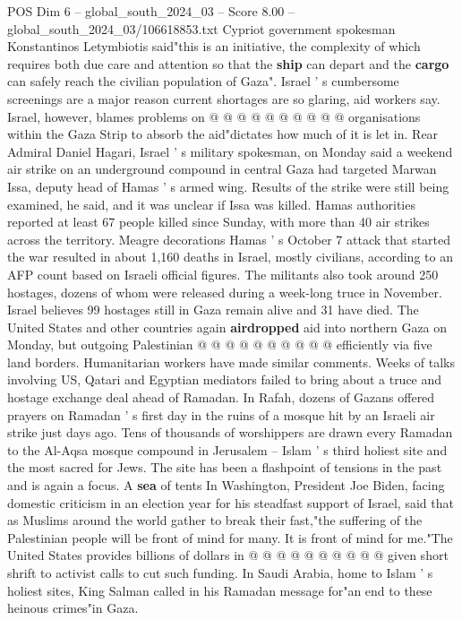 \begin{textsample}{POS Dim 6 – global\_south\_2024\_03 – Score 8.00 – global\_south\_2024\_03/106618853.txt}
Cypriot government spokesman Konstantinos Letymbiotis said"this is an initiative, the complexity of which requires both due care and attention so that the \textbf{ship} can depart and the \textbf{cargo} can safely reach the civilian population of Gaza".
Israel ' s cumbersome screenings are a major reason current shortages are so glaring, aid workers say.
Israel, however, blames problems on @ @ @ @ @ @ @ @ @ @ organisations within the Gaza Strip to absorb the aid"dictates how much of it is let in.
Rear Admiral Daniel Hagari, Israel ' s military spokesman, on Monday said a weekend air strike on an underground compound in central Gaza had targeted Marwan Issa, deputy head of Hamas ' s armed wing.
Results of the strike were still being examined, he said, and it was unclear if Issa was killed.
Hamas authorities reported at least 67 people killed since Sunday, with more than 40 air strikes across the territory.
Meagre decorations Hamas ' s October 7 attack that started the war resulted in about 1,160 deaths in Israel, mostly civilians, according to an AFP count based on Israeli official figures.
The militants also took around 250 hostages, dozens of whom were released during a week-long truce in November.
Israel believes 99 hostages still in Gaza remain alive and 31 have died.
The United States and other countries again \textbf{airdropped} aid into northern Gaza on Monday, but outgoing Palestinian @ @ @ @ @ @ @ @ @ @ efficiently via five land borders.
Humanitarian workers have made similar comments.
Weeks of talks involving US, Qatari and Egyptian mediators failed to bring about a truce and hostage exchange deal ahead of Ramadan.
In Rafah, dozens of Gazans offered prayers on Ramadan ' s first day in the ruins of a mosque hit by an Israeli air strike just days ago.
Tens of thousands of worshippers are drawn every Ramadan to the Al-Aqsa mosque compound in Jerusalem -- Islam ' s third holiest site and the most sacred for Jews.
The site has been a flashpoint of tensions in the past and is again a focus.
A \textbf{sea} of tents In Washington, President Joe Biden, facing domestic criticism in an election year for his steadfast support of Israel, said that as Muslims around the world gather to break their fast,"the suffering of the Palestinian people will be front of mind for many.
It is front of mind for me."The United States provides billions of dollars in @ @ @ @ @ @ @ @ @ @ given short shrift to activist calls to cut such funding.
In Saudi Arabia, home to Islam ' s holiest sites, King Salman called in his Ramadan message for"an end to these heinous crimes"in Gaza.

\end{textsample}
